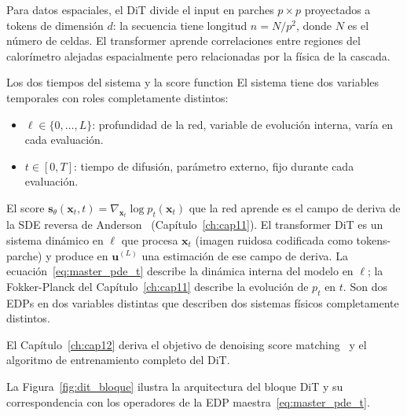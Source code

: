 Para datos espaciales, el DiT divide el input en parches
$p \times p$ proyectados a tokens de dimensión $d$: la secuencia
tiene longitud $n = N/p^2$, donde $N$ es el número de celdas.
El transformer aprende correlaciones entre regiones del calorímetro
alejadas espacialmente pero relacionadas por la física de la
cascada.

\begin{observacion}{Los dos tiempos del sistema y la score function}
\label{obs:dos_tiempos}
El sistema tiene dos variables temporales con roles completamente
distintos:
\begin{itemize}
  \item $\ell \in \{0,\ldots,L\}$: profundidad de la red,
        variable de evolución interna, varía en cada evaluación.
  \item $t \in [0,T]$: tiempo de difusión, parámetro externo,
        fijo durante cada evaluación.
\end{itemize}
El score $\bm{s}_\theta(\bm{x}_t, t) =
\nabla_{\bm{x}_t}\log p_t(\bm{x}_t)$ que la red aprende es el
campo de deriva de la SDE reversa de
Anderson~\cite{anderson1982reverse} (Capítulo~\ref{ch:cap11}).
El transformer DiT es un sistema dinámico en $\ell$ que procesa
$\bm{x}_t$ (imagen ruidosa codificada como tokens-parche) y
produce en $\bm{u}^{(L)}$ una estimación de ese campo de deriva.
La ecuación~\eqref{eq:master_pde_t} describe la dinámica interna
del modelo en $\ell$; la Fokker-Planck del Capítulo~\ref{ch:cap11}
describe la evolución de $p_t$ en $t$. Son dos EDPs en dos
variables distintas que describen dos sistemas físicos
completamente distintos.

El Capítulo~\ref{ch:cap12} deriva el objetivo de denoising score
matching~\cite{vincent2011connection} y el algoritmo de
entrenamiento completo del DiT.
\end{observacion}

La Figura~\ref{fig:dit_bloque} ilustra la arquitectura del bloque
DiT y su correspondencia con los operadores de la EDP
maestra~\eqref{eq:master_pde_t}.

